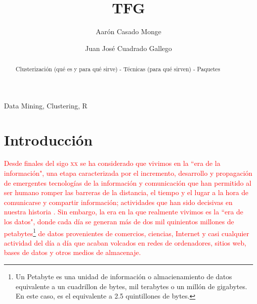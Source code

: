 \documentclass[3p,twocolumn]{elsarticle}
\begin{document}
\title{TFG} %

\author[1]{Aarón Casado Monge} %

\author[2]{Juan José Cuadrado Gallego} %

\address{University of Alcala, Polytechnic School, Computer Science Department, Scientific and Technological Campus, Politechnic Building. Office: O243, 28805, Alcala de Henares, Madrid, Spain}

\begin{abstract}
Clusterización (qué es y para qué sirve) - Técnicas (para qué sirven) - Paquetes 
\end{abstract}

\begin{keyword}
Data Mining, Clustering, R
\end{keyword}

\maketitle %
 
 
 
 
\section{Introducción}


\textcolor{Red} {Desde finales del sigo \textsc{xx} se ha considerado que vivimos en la ``era de la información", una etapa caracterizada por el incremento, desarrollo y propagación de emergentes tecnologías de la información y comunicación que han permitido al ser humano romper las barreras de la distancia, el tiempo y el lugar a la hora de comunicarse y compartir información; actividades que han sido decisivas en nuestra historia \cite{1}. Sin embargo, la era en la que realmente vivimos es la ``era de los datos", donde cada día se generan más de dos mil quinientos millones de petabytes\footnote {Un Petabyte es una unidad de información o almacienamiento de datos equivalente a un cuadrillon de bytes, mil terabytes o un millón de gigabytes. En este caso, es el equivalente a 2.5 quintillones de bytes.} de datos provenientes de comercios, ciencias, Internet y casi cualquier actividad del día a día \cite{2} que acaban volcados en redes de ordenadores, sitios web, bases de datos y otros medios de almacenaje. }
\end{document}
